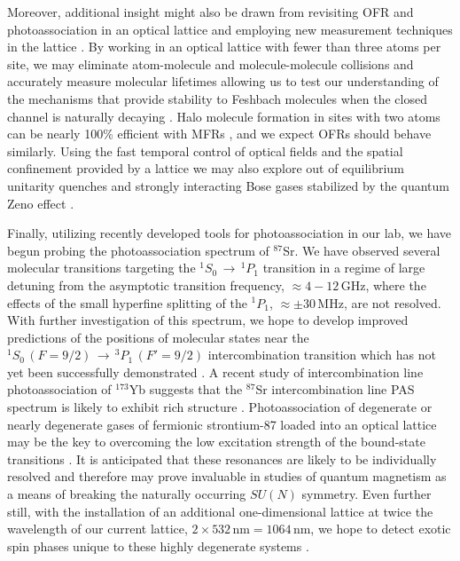 Moreover, additional insight might also be drawn from revisiting OFR and photoassociation in an optical lattice and employing new measurement techniques in the lattice \cite{Taie2016}. 
By working in an optical lattice with fewer than three atoms per site, we may eliminate atom-molecule and molecule-molecule collisions and accurately measure molecular lifetimes \cite{Thalhammer2006,lsb08} allowing us to test our understanding of the mechanisms that provide stability to Feshbach molecules when the closed channel is naturally decaying \cite{Kohler2005}.
Halo molecule formation in sites with two atoms can be nearly 100\% efficient with MFRs \cite{Mies2000,Chin2010}, and we expect OFRs should behave similarly.
Using the fast temporal control of optical fields and the spatial confinement provided by a lattice we may also explore out of equilibrium unitarity quenches \cite{Makotyn2014} and strongly interacting Bose gases stabilized by the quantum Zeno effect \cite{fgr01,Zhu2014,Daley2009,Syassen2008}.

Finally, utilizing recently developed tools for photoassociation in our lab, we have begun probing the photoassociation spectrum of $^{87}$Sr.
We have observed several molecular transitions targeting the $^1S_0\,\rightarrow\,^1P_1$ transition in a regime of large detuning from the asymptotic transition frequency, $\approx 4-12\,$GHz, where the effects of the small hyperfine splitting of the $^1P_1$, $\approx \pm30\,$MHz, are not resolved.
With further investigation of this spectrum, we hope to develop improved predictions of the positions of molecular states near the $^1S_0\,(F=9/2)\,\rightarrow\,^3P_1\,(F'=9/2)$ intercombination transition which has not yet been successfully demonstrated \cite{Reschovsky}.
A recent study of intercombination line photoassociation of $^{173}$Yb suggests that the $^{87}$Sr intercombination line PAS spectrum is likely to exhibit rich structure \cite{Han2018a, Franchi2017,Kim2016}.
Photoassociation of degenerate or nearly degenerate gases of fermionic strontium-87 loaded into an optical lattice may be the key to overcoming the low excitation strength of the bound-state transitions \cite{bhm12,tys12}.
It is anticipated that these resonances are likely to be individually resolved \cite{Han2018a} and therefore may prove invaluable in studies of quantum magnetism as a means of breaking the naturally occurring $SU(N)$ symmetry.
Even further still, with the installation of an additional one-dimensional lattice at twice the wavelength of our current lattice, $2\times 532\,\text{nm} = 1064\,$nm, we hope to detect exotic spin phases unique to these highly degenerate systems \cite{Beverland2016,cre14,Chen2015, pbl08, Gorshkov2010,Scazza2014, ftc07,Cappellini2014}. 

